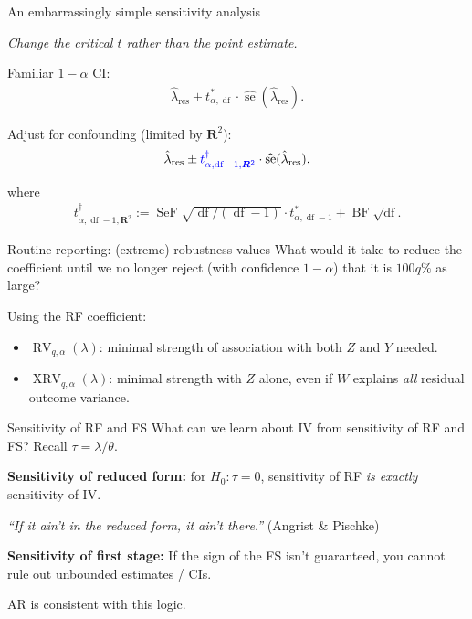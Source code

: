 \documentclass[xcolor=dvipsnames]{beamer}
\newcommand\R{{\bm R}}
\DeclareMathOperator{\se}{se}
\DeclareMathOperator{\df}{df}
\DeclareMathOperator{\rv}{RV}
\DeclareMathOperator{\xrv}{XRV}
\DeclareMathOperator{\BF}{BF}
\DeclareMathOperator{\SeF}{SeF}
\begin{document}
\begin{frame}{An embarrassingly simple sensitivity analysis}
\begin{center}
\textit{Change the critical $t$ rather than the point estimate.}
\end{center}
\medskip

 Familiar $1-\alpha$ CI:
\begin{align*}
\hat{\lambda}_{\text{res}} \pm t^*_{\alpha, \df} \cdot \widehat{\se}(\hat{\lambda}_{\text{res}}).
\end{align*}

 Adjust for confounding (limited by $\R^2$):
\begin{align*}
\hat{\lambda}_{\text{res}} \pm \textcolor{blue}{t^\dagger_{\alpha, \df-1, \R^2}} \cdot \widehat{\se}(\hat{\lambda}_{\text{res}}),
\end{align*}

 where
\begin{align*}
t^\dagger_{\alpha, \df-1, \R^2} := \SeF\sqrt{\df/(\df-1)} \cdot t^*_{\alpha, \df-1} + \BF\sqrt{\df}.
\end{align*}
\end{frame}


\begin{frame}{Routine reporting: (extreme) robustness values}
What would it take to reduce the coefficient until we no longer reject (with confidence $1-\alpha$) that it is $100q\%$ as large?
\bigskip

 Using the RF coefficient:
\begin{itemize}
\item $\rv_{q,\alpha}(\lambda)$: minimal strength of association with both $Z$ and $Y$ needed.
\medskip
\item $\xrv_{q,\alpha}(\lambda)$: minimal strength with $Z$ alone, even if $W$ explains \textit{all} residual outcome variance.
\end{itemize}
\end{frame}


\begin{frame}{Sensitivity of RF and FS}
\small
{} What can we learn about IV from sensitivity of RF and FS?
\medskip
{} Recall ${\tau} = {\lambda}/{\theta}$.

 \textbf{Sensitivity of reduced form:} for $H_0: \tau = 0$, sensitivity of RF \textit{is exactly} sensitivity of IV.
\begin{center}
\textit{``If it ain't in the reduced form, it ain't there.''} (Angrist \& Pischke)
\end{center}

 \textbf{Sensitivity of first stage:} If the sign of the FS isn't guaranteed, you cannot rule out unbounded estimates / CIs.

 AR is consistent with this logic.
\end{frame}
\end{document}
